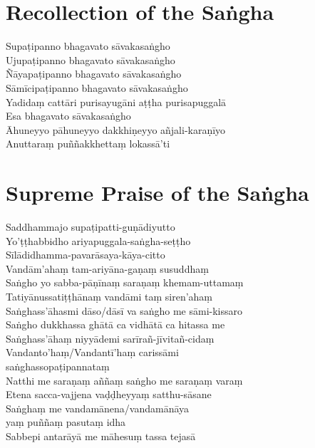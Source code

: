 \section*{Recollection of the Saṅgha}

\begin{leader}
\end{leader}

Supaṭipanno bhagavato sāvakasaṅgho\\
Ujupaṭipanno bhagavato sāvakasaṅgho\\
Ñāyapaṭipanno bhagavato sāvakasaṅgho\\
Sāmīcipaṭipanno bhagavato sāvakasaṅgho\\
Yadidaṃ cattāri purisayugāni aṭṭha purisapuggalā\\
Esa bhagavato sāvakasaṅgho\\
Āhuneyyo pāhuneyyo dakkhiṇeyyo añjali-karaṇīyo\\
Anuttaraṃ puññakkhettaṃ lokassā'ti

\section*{Supreme Praise of the Saṅgha}

\begin{leader}
\end{leader}

Saddhammajo supaṭipatti-guṇādiyutto\\
Yo'ṭṭhabbidho ariyapuggala-saṅgha-seṭṭho\\
Sīlādidhamma-pavarāsaya-kāya-citto\\
Vandām'ahaṃ tam-ariyāna-gaṇaṃ susuddhaṃ\\
Saṅgho yo sabba-pāṇīnaṃ saraṇaṃ khemam-uttamaṃ\\
Tatiyānussatiṭṭhānaṃ vandāmi taṃ siren'ahaṃ\\
Saṅghass'āhasmi dāso/dāsī va saṅgho me sāmi-kissaro\\
Saṅgho dukkhassa ghātā ca vidhātā ca hitassa me\\
Saṅghass'āhaṃ niyyādemi sarīrañ-jīvitañ-cidaṃ\\
Vandanto'haṃ/Vandantī'haṃ carissāmi\\
\vin saṅghassopaṭipannataṃ\\
Natthi me saraṇaṃ aññaṃ saṅgho me saraṇaṃ varaṃ\\
Etena sacca-vajjena vaḍḍheyyaṃ satthu-sāsane\\
Saṅghaṃ me vandamānena/vandamānāya\\
\vin yaṃ puññaṃ pasutaṃ idha\\
Sabbepi antarāyā me māhesuṃ tassa tejasā

